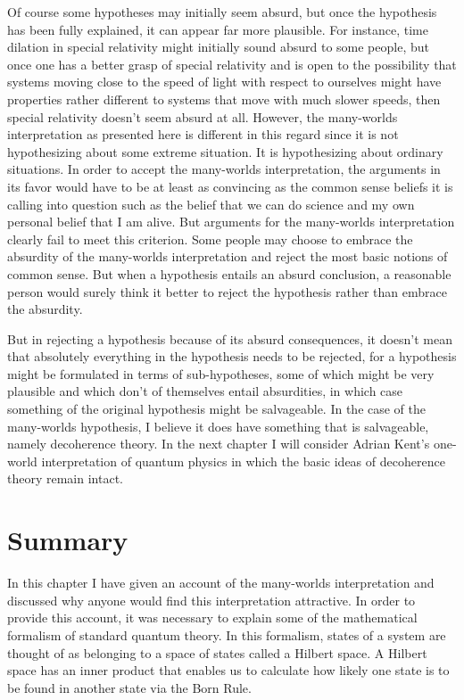 \documentclass[12pt]{report}
\begin{document}
        Of course some hypotheses may initially seem absurd, but once the hypothesis has been fully explained, it can appear far more plausible. For instance, time dilation in special relativity might initially sound absurd to some people, but once one has a better grasp of special relativity and is open to the possibility that  systems moving close to the speed of light with respect to ourselves might have properties rather different to systems that move with much slower speeds, then special relativity doesn't seem absurd at all. However, the many-worlds interpretation as presented here is different in this regard since it is not hypothesizing about some extreme situation. It is hypothesizing about ordinary situations. In order to accept the many-worlds interpretation, the arguments in its favor would have to be at least as convincing as the common sense beliefs it is calling into question such as the belief that we can do science and my own personal belief that I am alive. But arguments for the many-worlds interpretation clearly fail to meet this criterion. Some people may choose to embrace the absurdity of the many-worlds interpretation and reject the most basic notions of common sense. But when a hypothesis entails an absurd conclusion, a reasonable person would surely think it better to reject the hypothesis rather than embrace the absurdity. 
         
        But in rejecting a hypothesis because of its absurd consequences, it doesn't mean that absolutely everything in the hypothesis needs to be rejected, for  a hypothesis might be formulated in terms of sub-hypotheses, some of which might be very plausible and which don't of themselves entail absurdities, in which case something of the original hypothesis might be salvageable. In the case of the many-worlds hypothesis, I believe it does have something that is salvageable, namely decoherence theory. In the next chapter I will consider Adrian Kent's one-world interpretation of quantum physics in which the basic ideas of decoherence theory remain intact.
       
       

\section{Summary}\label{manyworldssummary}
In this chapter I have given an account of the many-worlds interpretation and discussed why anyone would find this interpretation attractive. In order to provide this account, it was necessary to explain some of the mathematical formalism of standard quantum theory. In this formalism, states of a system are thought of as belonging to a space of states called a Hilbert space. A Hilbert space has an inner product that enables us to calculate how likely one state is to be found in another state via the Born Rule. 
\end{document}
